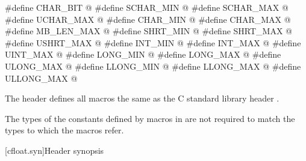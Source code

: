 %
%
%
%
%
%
%
%
%
%
%
%
%
%
%
%
%
%
%
%
\begin{codeblock}
#define CHAR_BIT @\seebelow@
#define SCHAR_MIN @\seebelow@
#define SCHAR_MAX @\seebelow@
#define UCHAR_MAX @\seebelow@
#define CHAR_MIN @\seebelow@
#define CHAR_MAX @\seebelow@
#define MB_LEN_MAX @\seebelow@
#define SHRT_MIN @\seebelow@
#define SHRT_MAX @\seebelow@
#define USHRT_MAX @\seebelow@
#define INT_MIN @\seebelow@
#define INT_MAX @\seebelow@
#define UINT_MAX @\seebelow@
#define LONG_MIN @\seebelow@
#define LONG_MAX @\seebelow@
#define ULONG_MAX @\seebelow@
#define LLONG_MIN @\seebelow@
#define LLONG_MAX @\seebelow@
#define ULLONG_MAX @\seebelow@
\end{codeblock}

\pnum
The header  defines all macros the same as
the C standard library header .
\begin{note}
The types of the constants defined by macros in  are not
required to match the types to which the macros refer.
\end{note}


[cfloat.syn]{Header  synopsis}

